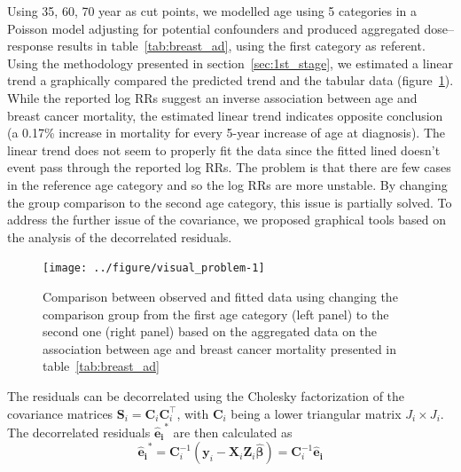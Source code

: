 \documentclass[11pt,a4paper,twoside,openany]{book}\usepackage{knitr}
\begin{document}
{Using 35, 60, 70 year as cut points, we modelled age using 5 categories in a Poisson model adjusting for potential confounders and produced aggregated dose--response results in table~\ref{tab:breast_ad}, using the first category as referent. Using the methodology presented in section~\ref{sec:1st_stage}, we estimated a linear trend a graphically compared the predicted trend and the tabular data (figure~\ref{fig:visual_problem}). While the reported log RRs suggest an inverse association between age and breast cancer mortality, the estimated linear trend indicates opposite conclusion (a 0.17\% increase in mortality for every 5-year increase of age at diagnosis). The linear trend does not seem to properly fit the data since the fitted lined doesn't event pass through the reported log RRs. The problem is that there are few cases in the reference age category and so the log RRs are more unstable. By changing the group comparison to the second age category, this issue is partially solved. To address the further issue of the covariance, we proposed graphical tools based on the analysis of the decorrelated residuals.

\begin{knitrout}\footnotesize
{}\color{fgcolor}\begin{figure}[ht!]

{\centering \texttt{[image: ../figure/visual\_problem-1]} 

}

\caption{Comparison between observed and fitted data using changing the comparison group from the first age category (left panel) to the second one (right panel) based on the aggregated data on the association between age and breast cancer mortality presented in table~\ref{tab:breast_ad}}\label{fig:visual_problem}
\end{figure}


\end{knitrout}

The residuals can be decorrelated using the Cholesky factorization of the covariance matrices $\mathbf{S}_i = \mathbf{C}_i\mathbf{C}_i^\top$, with $\mathbf{C}_i$ being a lower triangular matrix $J_i \times J_i$. The decorrelated residuals $\boldsymbol{\hat e_i}^*$ are then calculated as
\begin{equation}
\boldsymbol{\hat e_i}^* = \mathbf{C}_i^{-1} \left(\mathbf{y}_i - \mathbf{X}_i \mathbf{Z}_i \boldsymbol{\hat \beta} \right) = \mathbf{C}_i^{-1}\boldsymbol{\hat e_i}
\label{eq:decor_res}
\end{equation}

}
\end{document}
